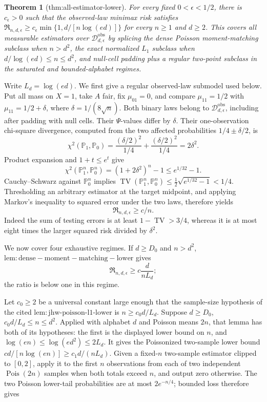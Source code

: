 \documentclass{article}
\newtheorem{theorem}{Theorem}
\begin{document}
\begin{theorem}[thm:all-estimator-lower]\label{thm:all-estimator-lower}
For every fixed \(0<\epsilon<1/2\), there is \(c_\epsilon>0\) such that the observed-law minimax risk satisfies \(\mathfrak R_{n,d,\epsilon}\geq c_\epsilon\min\{1,d/[n\log(ed)]\}\) for every \(n\geq1\) and \(d\geq2\).  This covers all measurable estimators over \(\mathcal D_{d,\epsilon}^{\mathrm{obs}}\) by splicing the dense Poisson moment-matching subclass when \(n>d^2\), the exact normalized \(L_1\) subclass when \(d/\log(ed)\leq n\leq d^2\), and null-cell padding plus a regular two-point subclass in the saturated and bounded-alphabet regimes.
\end{theorem}
Write \(L_d=\log(ed)\).  We first give a regular observed-law submodel used below.  Put all mass on \(X=1\), take \(A\) fair, fix \(\mu_{01}=0\), and compare \(\mu_{11}=1/2\) with \(\mu_{11}=1/2+\delta\), where \(\delta=1/(8\sqrt n)\).  Both binary laws belong to \(\mathcal D_{d,\epsilon}^{\mathrm{obs}}\), including after padding with null cells.  Their \(\Psi\)-values differ by \(\delta\).  Their one-observation chi-square divergence, computed from the two affected probabilities \(1/4\pm\delta/2\), is
\[
 \chi^2(\mathbb P_1,\mathbb P_0)
 =\frac{(\delta/2)^2}{1/4}+\frac{(\delta/2)^2}{1/4}=2\delta^2.
\]
Product expansion and \(1+t\leq e^t\) give
\[
 \chi^2(\mathbb P_1^n,\mathbb P_0^n)
 =(1+2\delta^2)^n-1\leq e^{1/32}-1.                                \tag{29}
\]
Cauchy--Schwarz against \(\mathbb P_0^n\) implies \(\operatorname{TV}(\mathbb P_1^n,\mathbb P_0^n)\leq\tfrac12\sqrt{e^{1/32}-1}<1/4\).  Thresholding an arbitrary estimator at the target midpoint, and applying Markov's inequality to squared error under the two laws, therefore yields
\[
 \mathfrak R_{n,d,\epsilon}\geq c/n.                               \tag{30}
\]
Indeed the sum of testing errors is at least \(1-\operatorname{TV}>3/4\), whereas it is at most eight times the larger squared risk divided by \(\delta^2\).

We now cover four exhaustive regimes.  If \(d\geq D_0\) and \(n>d^2\), \(\mathrm{lem:dense-moment-matching-lower}\) gives
\[
 \mathfrak R_{n,d,\epsilon}\geq c\frac d{nL_d};                    \tag{31}
\]
the ratio is below one in this regime.

Let \(c_0\geq2\) be a universal constant large enough that the sample-size hypothesis of the cited \(\mathrm{lem:jhw\mbox{-}poisson\mbox{-}l1\mbox{-}lower}\) is \(n\geq c_0d/L_d\).  Suppose \(d\geq D_0\), \(c_0d/L_d\leq n\leq d^2\).  Applied with alphabet \(d\) and Poisson means \(2n\), that lemma has both of its hypotheses: the first is the displayed lower bound on \(n\), and \(\log(en)\leq\log(ed^2)\leq2L_d\).  It gives the Poissonized two-sample lower bound \(c d/[n\log(en)]\geq c_1d/(nL_d)\).  Given a fixed-\(n\) two-sample estimator clipped to \([0,2]\), apply it to the first \(n\) observations from each of two independent \(\operatorname{Pois}(2n)\) samples when both totals exceed \(n\), and output zero otherwise.  The two Poisson lower-tail probabilities are at most \(2e^{-n/4}\); bounded loss therefore gives
\end{document}
